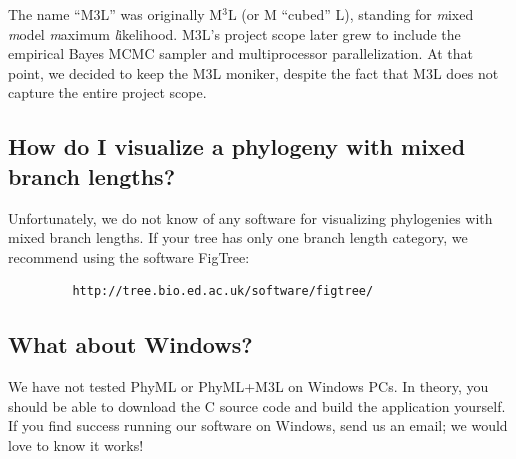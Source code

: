 \documentclass[11pt]{article}
\begin{document}
The name ``M3L'' was originally M$^3$L (or M ``cubed'' L), standing for \textit{m}ixed \textit{m}odel \textit{m}aximum \textit{l}ikelihood.
M3L's project scope later grew to include the empirical Bayes MCMC sampler and multiprocessor parallelization.  At that point, we decided to keep the M3L moniker, despite the fact that M3L does not capture the entire project scope.

\subsection{How do I visualize a phylogeny with mixed branch lengths?}

Unfortunately, we do not know of any software for visualizing phylogenies with mixed branch lengths.  If your tree has only one branch length category, we recommend using the software FigTree:

\begin{verbatim}
         http://tree.bio.ed.ac.uk/software/figtree/
\end{verbatim}

\subsection{What about Windows?}

We have not tested PhyML or PhyML+M3L on Windows PCs.  In theory, you should be able to download the C source code and build the application yourself.  If you find success running our software on Windows, send us an email; we would love to know it works!
\end{document}

